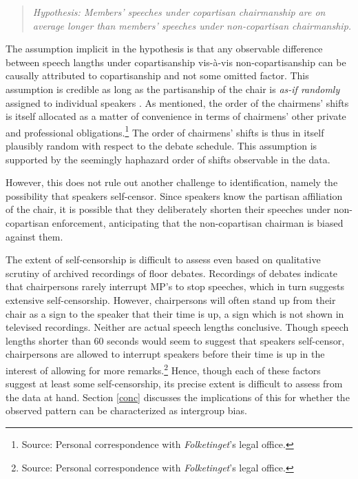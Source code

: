 \documentclass[12pt,a4paper]{article}
\begin{document}
\begin{quote}
\textit{Hypothesis: Members' speeches under copartisan chairmanship are on average longer than members' speeches under non-copartisan chairmanship.}
\end{quote}

The assumption implicit in the hypothesis is that any observable difference between speech langths under copartisanship vis-à-vis non-copartisanship can be causally attributed to copartisanship and not some omitted factor. This assumption is credible as long as the partisanship of the chair is \textit{as-if randomly} assigned to individual speakers \citep{Dunning2007}. As mentioned, the order of the chairmens' shifts is itself allocated as a matter of convenience in terms of chairmens' other private and professional obligations.\footnote{Source: Personal correspondence with \textit{Folketinget}'s legal office.} The order of chairmens' shifts is thus in itself plausibly random with respect to the debate schedule. This assumption is supported by the seemingly haphazard order of shifts observable in the data.

However, this does not rule out another challenge to identification, namely the possibility that speakers self-censor. Since speakers know the partisan affiliation of the chair, it is possible that they deliberately shorten their speeches under non-copartisan enforcement, anticipating that the non-copartisan chairman is biased against them. 

The extent of self-censorship is difficult to assess even based on qualitative scrutiny of archived recordings of floor debates. Recordings of debates indicate that chairpersons rarely interrupt MP's to stop speeches, which in turn suggests extensive self-censorship. However, chairpersons will often stand up from their chair as a sign to the speaker that their time is up, a sign which is not shown in televised recordings. Neither are actual speech lengths conclusive. Though speech lengths shorter than 60 seconds would seem to suggest that speakers self-censor, chairpersons are allowed to interrupt speakers before their time is up in the interest of allowing for more remarks.\footnote{Source: Personal correspondence with \textit{Folketinget}'s legal office.}  Hence, though each of these factors suggest at least some self-censorship, its precise extent is difficult to assess from the data at hand. Section \ref{conc} discusses the implications of this for whether the observed pattern can be characterized as intergroup bias.
\end{document}
